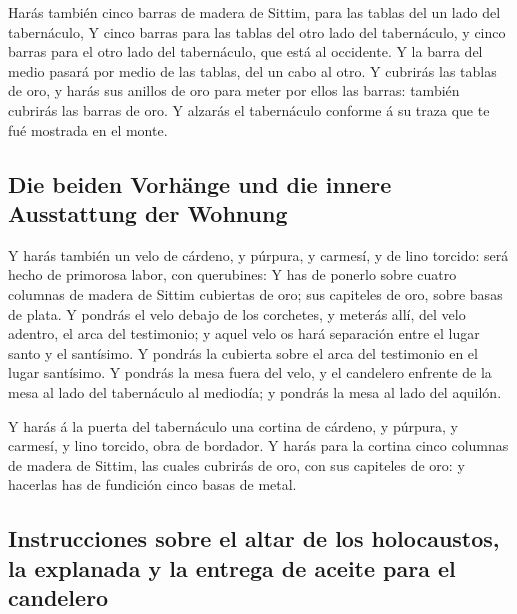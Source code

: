  Harás también cinco barras de madera de Sittim, para las
tablas del un lado del tabernáculo,  Y cinco barras para
las tablas del otro lado del tabernáculo, y cinco barras para el otro
lado del tabernáculo, que está al occidente.  Y la barra
del medio pasará por medio de las tablas, del un cabo al otro.
 Y cubrirás las tablas de oro, y harás sus anillos de oro
para meter por ellos las barras: también cubrirás las barras de oro.
 Y alzarás el tabernáculo conforme á su traza que te fué
mostrada en el monte.

\hypertarget{die-beiden-vorhuxe4nge-und-die-innere-ausstattung-der-wohnung}{%
\subsection{Die beiden Vorhänge und die innere Ausstattung der
Wohnung}\label{die-beiden-vorhuxe4nge-und-die-innere-ausstattung-der-wohnung}}

 Y harás también un velo de cárdeno, y púrpura, y carmesí,
y de lino torcido: será hecho de primorosa labor, con querubines:
 Y has de ponerlo sobre cuatro columnas de madera de Sittim
cubiertas de oro; sus capiteles de oro, sobre basas de plata.
 Y pondrás el velo debajo de los corchetes, y meterás allí,
del velo adentro, el arca del testimonio; y aquel velo os hará
separación entre el lugar santo y el santísimo.  Y pondrás
la cubierta sobre el arca del testimonio en el lugar santísimo.
 Y pondrás la mesa fuera del velo, y el candelero enfrente
de la mesa al lado del tabernáculo al mediodía; y pondrás la mesa al
lado del aquilón.

 Y harás á la puerta del tabernáculo una cortina de
cárdeno, y púrpura, y carmesí, y lino torcido, obra de bordador.
 Y harás para la cortina cinco columnas de madera de
Sittim, las cuales cubrirás de oro, con sus capiteles de oro: y hacerlas
has de fundición cinco basas de metal.

\hypertarget{instrucciones-sobre-el-altar-de-los-holocaustos-la-explanada-y-la-entrega-de-aceite-para-el-candelero}{%
\subsection{Instrucciones sobre el altar de los holocaustos, la
explanada y la entrega de aceite para el
candelero}\label{instrucciones-sobre-el-altar-de-los-holocaustos-la-explanada-y-la-entrega-de-aceite-para-el-candelero}}

